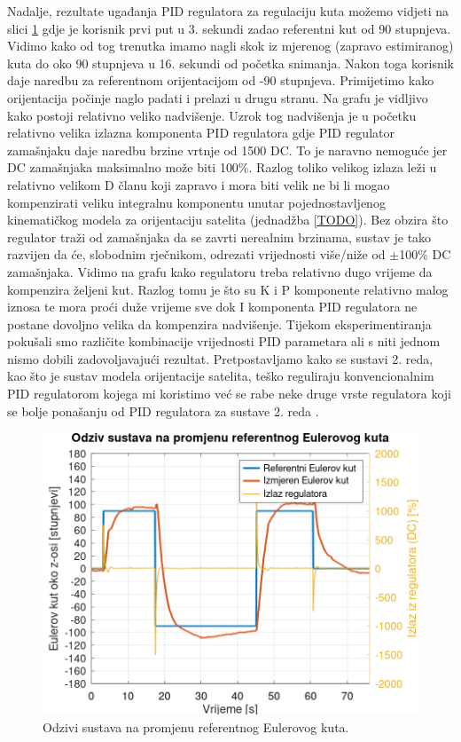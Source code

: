 \documentclass[times, utf8, diplomski, numeric]{templates/template}
\begin{document}
{{        Nadalje, rezultate ugađanja PID regulatora za regulaciju kuta možemo vidjeti na slici \ref{fig:angle_reg_user} gdje je korisnik prvi put u 3. sekundi zadao referentni kut od 90 stupnjeva. Vidimo kako od tog trenutka imamo nagli skok iz mjerenog (zapravo estimiranog) kuta do oko 90 stupnjeva u 16. sekundi od početka snimanja. Nakon toga korisnik daje naredbu za referentnom orijentacijom od -90 stupnjeva. Primijetimo kako orijentacija počinje naglo padati i prelazi u drugu stranu. Na grafu je vidljivo kako postoji relativno veliko nadvišenje. Uzrok tog nadvišenja je u početku relativno velika izlazna komponenta PID regulatora gdje PID regulator zamašnjaku daje naredbu brzine vrtnje od 1500 DC. To je naravno nemoguće jer DC zamašnjaka maksimalno može biti 100\%. Razlog toliko velikog izlaza leži u relativno velikom D članu koji zapravo i mora biti velik ne bi li mogao kompenzirati veliku integralnu komponentu unutar pojednostavljenog kinematičkog modela za orijentaciju satelita (jednadžba \ref{TODO}). Bez obzira što regulator traži od zamašnjaka da se zavrti nerealnim brzinama, sustav je tako razvijen da će, slobodnim rječnikom, odrezati  vrijednosti više/niže od $\pm$100\% DC zamašnjaka. Vidimo na grafu kako regulatoru treba relativno dugo vrijeme da kompenzira željeni kut. Razlog tomu je što su K i P komponente relativno malog iznosa te mora proći duže vrijeme sve dok I komponenta PID regulatora ne postane dovoljno velika da kompenzira nadvišenje. Tijekom eksperimentiranja pokušali smo različite kombinacije vrijednosti PID parametara ali s niti jednom nismo dobili zadovoljavajući rezultat. Pretpostavljamo kako se sustavi 2. reda, kao što je sustav modela orijentacije satelita, teško reguliraju konvencionalnim PID regulatorom kojega mi koristimo već se rabe neke druge vrste regulatora koji se bolje ponašanju od PID regulatora za sustave 2. reda \cite{reg_2_red}. 
        
        \begin{figure}[htb]
        \centering
        \includegraphics[width=1.0\textwidth]{other/angle_reg_user.png}
        \caption{Odzivi sustava na promjenu referentnog Eulerovog kuta.}
        \label{fig:angle_reg_user}
        \end{figure}

}}
\end{document}
